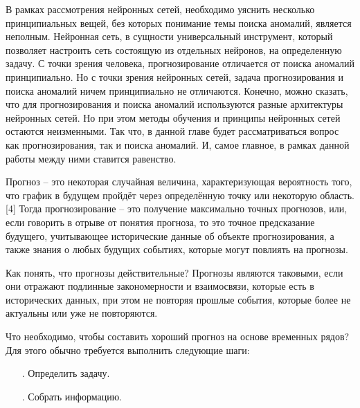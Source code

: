 {\gostFont
	
	\par \redline В рамках рассмотрения нейронных сетей, необходимо уяснить несколько принципиальных вещей, без которых понимание темы поиска аномалий, является неполным. Нейронная сеть, в сущности универсальный инструмент, который позволяет настроить сеть состоящую из отдельных нейронов, на определенную задачу. С точки зрения человека, прогнозирование отличается от поиска аномалий принципиально. Но с точки зрения нейронных сетей, задача прогнозирования и поиска аномалий ничем принципиально не отличаются. Конечно, можно сказать, что для прогнозирования и поиска аномалий используются разные архитектуры нейронных сетей. Но при этом методы обучения и принципы нейронных сетей остаются неизменными. Так что, в данной главе будет рассматриваться вопрос как прогнозирования, так и поиска аномалий. И, самое главное, в рамках данной работы между ними ставится равенство.     
	
	\par \redline Прогноз {--} это некоторая случайная величина, характеризующая вероятность того, что график в будущем пройдёт через определённую точку или некоторую область.[4] Тогда прогнозирование {--} это получение максимально точных прогнозов, или, если говорить в отрыве от понятия прогноза, то это точное предсказание будущего, учитывающее исторические данные об объекте прогнозирования, а также знания о любых будущих событиях, которые могут повлиять на прогнозы. 
	
	\par \redline Как понять, что прогнозы действительные? Прогнозы являются таковыми, если они отражают подлинные закономерности и взаимосвязи, которые есть в исторических данных, при этом не повторяя прошлые события, которые более не актуальны или уже не повторяются. 
	
	\par \redline Что необходимо, чтобы составить хороший прогноз на основе временных рядов? Для этого обычно требуется выполнить следующие шаги:
	
	
	\begin{itemize}[leftmargin=2.15cm, labelwidth=0.65cm, labelsep=0.0cm] 
		
		\item[\theitemcntr. ] Определить задачу. 
		\addtocounter{itemcntr}{1}
		
		\item[\theitemcntr. ] Собрать информацию.
		\addtocounter{itemcntr}{1}
		

\end{itemize}}
